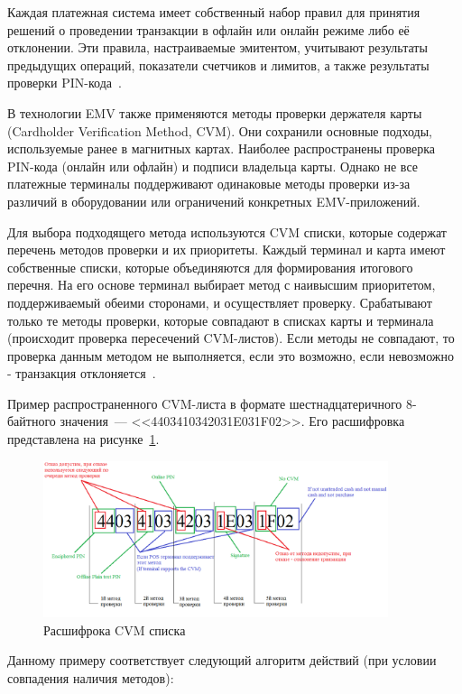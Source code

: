 Каждая платежная система имеет собственный набор правил для принятия решений о проведении транзакции в офлайн или онлайн режиме либо её отклонении.
Эти правила, настраиваемые эмитентом, учитывают результаты предыдущих операций, показатели счетчиков и лимитов, а также результаты проверки PIN-кода~\cite{secure_nfc_mc}.


В технологии EMV также применяются методы проверки держателя карты (Cardholder Verification Method, CVM).
Они сохранили основные подходы, используемые ранее в магнитных картах.
Наиболее распространены проверка PIN-кода (онлайн или офлайн) и подписи владельца карты.
Однако не все платежные терминалы поддерживают одинаковые методы проверки из-за различий в оборудовании или ограничений конкретных EMV-приложений.

Для выбора подходящего метода используются CVM списки, которые содержат перечень методов проверки и их приоритеты.
Каждый терминал и карта имеют собственные списки, которые объединяются для формирования итогового перечня.
На его основе терминал выбирает метод с наивысшим приоритетом, поддерживаемый обеими сторонами, и осуществляет проверку.
Срабатывают только те методы проверки, которые совпадают в списках карты и терминала (происходит проверка пересечений CVM-листов).
Если методы не совпадают, то проверка данным методом не выполняется, если это возможно, если невозможно - транзакция отклоняется~\cite{emv_card_mechanism, emv_book_3}.

Пример распространенного CVM-листа в формате шестнадцатеричного 8-байтного значения~--- <<4403410342031E031F02>>.
Его расшифровка представлена на рисунке~\ref{fig:cvm_check}.

\begin{figure}[H]
    \centering
    \includegraphics[width=0.9\textwidth]{images/research/cvm_check}
    \caption{\centering Расшифрока CVM списка}
    \label{fig:cvm_check}
\end{figure}

Данному примеру соответствует следующий алгоритм действий (при условии совпадения наличия методов):

